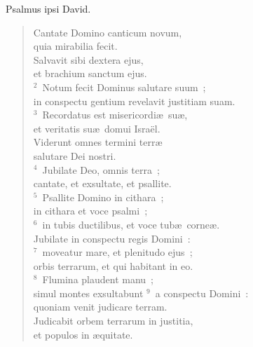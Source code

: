 \lettrine[lines=3,image=true,loversize=0.05,lraise=-0.03]{P}{}salmus ipsi David. \begin{flushleft}\begin{verse}\vspace{6pt}Cantate Domino canticum novum,\\ quia mirabilia fecit.\\ Salvavit sibi dextera ejus,\\ et brachium sanctum ejus.\\
${}^{2}$~Notum fecit Dominus salutare suum~;\\ in conspectu gentium revelavit justitiam suam.\\
${}^{3}$~Recordatus est misericordi\ae\ su\ae ,\\ et veritatis su\ae\ domui Isra\"el.\\ Viderunt omnes termini terr\ae \\ salutare Dei nostri.\\
${}^{4}$~Jubilate Deo, omnis terra~;\\ cantate, et exsultate, et psallite.\\
${}^{5}$~Psallite Domino in cithara~;\\ in cithara et voce psalmi~;\\
${}^{6}$~in tubis ductilibus, et voce tub\ae\ corne\ae .\\ Jubilate in conspectu regis Domini~:\\
${}^{7}$~moveatur mare, et plenitudo ejus~;\\ orbis terrarum, et qui habitant in eo.\\
${}^{8}$~Flumina plaudent manu~;\\ simul montes exsultabunt
${}^{9}$~a conspectu Domini~:\\ quoniam venit judicare terram.\\ Judicabit orbem terrarum in justitia,\\ et populos in \ae quitate.\end{verse}\end{flushleft}



